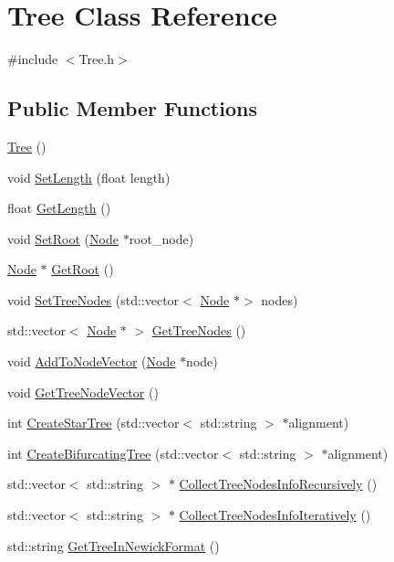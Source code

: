 \hypertarget{classTree}{}\section{Tree Class Reference}
\label{classTree}


{\ttfamily \#include $<$Tree.\+h$>$}

\subsection*{Public Member Functions}
\begin{DoxyCompactItemize}
\item 
\hyperlink{classTree_ad376a7c639d857312f5de2ef47482f68}{Tree} ()
\item 
void \hyperlink{classTree_aa16a8485326ce51d6d7324f23066eb27}{Set\+Length} (float length)
\item 
float \hyperlink{classTree_a5812392cfc9ed68d1fc3713d708a5e8f}{Get\+Length} ()
\item 
void \hyperlink{classTree_ae592faa2c1f2da3cc1157bd9a4b884b5}{Set\+Root} (\hyperlink{classNode}{Node} $\ast$root\+\_\+node)
\item 
\hyperlink{classNode}{Node} $\ast$ \hyperlink{classTree_a866593b4b067b38394a090e0d57b132f}{Get\+Root} ()
\item 
void \hyperlink{classTree_a429c0d87d451e9b219e4d001923c7134}{Set\+Tree\+Nodes} (std\+::vector$<$ \hyperlink{classNode}{Node} $\ast$$>$ nodes)
\item 
std\+::vector$<$ \hyperlink{classNode}{Node} $\ast$ $>$ \hyperlink{classTree_a390ab7f66c8c33fe6780a372263d6d38}{Get\+Tree\+Nodes} ()
\item 
void \hyperlink{classTree_aba172068387b9b5be1a6750a30e8199a}{Add\+To\+Node\+Vector} (\hyperlink{classNode}{Node} $\ast$node)
\item 
void \hyperlink{classTree_aefee00842552e70746a5ed1fdca4f91f}{Get\+Tree\+Node\+Vector} ()
\item 
int \hyperlink{classTree_a489e5392997aebd8ae98c97fb4fdb0a0}{Create\+Star\+Tree} (std\+::vector$<$ std\+::string $>$ $\ast$alignment)
\item 
int \hyperlink{classTree_a1033914891d96918380c1770a179b670}{Create\+Bifurcating\+Tree} (std\+::vector$<$ std\+::string $>$ $\ast$alignment)
\item 
std\+::vector$<$ std\+::string $>$ $\ast$ \hyperlink{classTree_af09073cc7b7166d16213614b624f3388}{Collect\+Tree\+Nodes\+Info\+Recursively} ()
\item 
std\+::vector$<$ std\+::string $>$ $\ast$ \hyperlink{classTree_a9a6309402407a051b346e779169f2ffc}{Collect\+Tree\+Nodes\+Info\+Iteratively} ()
\item 
std\+::string \hyperlink{classTree_a27d9ae5dc8700822a6091eff1e548600}{Get\+Tree\+In\+Newick\+Format} ()
\end{DoxyCompactItemize}


